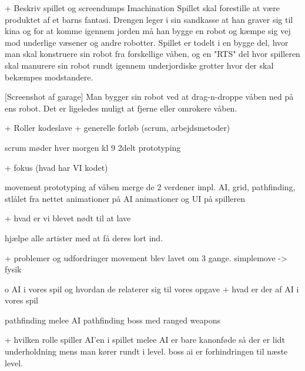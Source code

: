 


                + Beskriv spillet og screendumps
Imachination
Spillet skal forestille at være produktet af et barns fantasi. Drengen leger i sin sandkasse at han graver sig til kina og for at komme igennem jorden må han bygge en robot og kæmpe sig vej mod underlige væsener og andre robotter.
Spillet er todelt i en bygge del, hvor man skal konstruere sin robot fra forskellige våben, og en "RTS" del hvor spilleren skal manurere sin robot rundt igennem underjordiske grotter hvor der skal bekæmpes modstandere.

[Screenshot af garage]
Man bygger sin robot ved at drag-n-droppe våben ned på ens robot. Det er ligeledes muligt at fjerne eller omrokere våben.

                + Roller
kodeslave
                + generelle forløb (scrum, arbejdsmetoder)

scrum møder hver morgen kl 9
2delt prototyping

                + fokus (hvad har VI kodet)

movement
prototyping af våben
merge de 2 verdener
impl. AI, grid, pathfinding, stlålet fra nettet
animationer på AI
animationer og UI på spilleren


                + hvad er vi blevet nødt til at lave

hjælpe alle artister med at få deres lort ind.

                + problemer og udfordringer
movement blev lavet om 3 gange.
simplemove -> fysik

          o AI i vores spil og hvordan de relaterer sig til vores opgave
                + hvad er der af AI i vores spil

pathfinding melee AI
pathfinding boss med ranged weapons

                + hvilken rolle spiller AI’en i spillet
melee AI er bare kanonføde så der er lidt underholdning mens man kører rundt i level.
boss ai er forhindringen til næste level.
